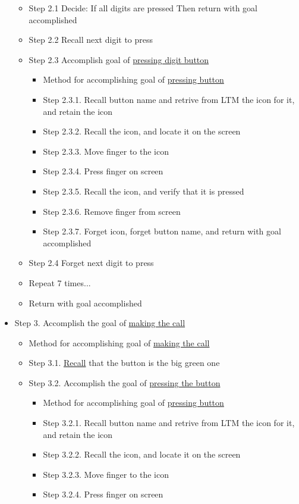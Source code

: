 \documentclass{article}
\begin{document}
\begin{itemize}
\begin{itemize}
    			\item Step 2.1 Decide: If all digits are pressed Then return with goal accomplished
    			\item Step 2.2 Recall next digit to press
    			\item Step 2.3 Accomplish goal of \uline{pressing digit button}
    			\begin{itemize}
					\item Method for accomplishing goal of \uline{pressing button}
					\item Step 2.3.1. Recall button name and retrive from LTM the icon for it, and retain the icon
					\item Step 2.3.2. Recall the icon, and locate it on the screen
					\item Step 2.3.3. Move finger to the icon
					\item Step 2.3.4. Press finger on screen
					\item Step 2.3.5. Recall the icon, and verify that it is pressed
					\item Step 2.3.6. Remove finger from screen
					\item Step 2.3.7. Forget icon, forget button name, and return with goal accomplished
				\end{itemize}
    			\item Step 2.4 Forget next digit to press
    			\item Repeat 7 times...
    			\item Return with goal accomplished
		\end{itemize}
	\item Step 3. Accomplish the goal of \uline{making the call}
		\begin{itemize}
			\item Method for accomplishing goal of \uline{making the call}
			\item Step 3.1. \uline{Recall} that the button is the big green one
			\item Step 3.2. Accomplish the goal of \uline{pressing the button}
				\begin{itemize}
					\item Method for accomplishing goal of \uline{pressing button}
					\item Step 3.2.1. Recall button name and retrive from LTM the icon for it, and retain the icon
					\item Step 3.2.2. Recall the icon, and locate it on the screen
					\item Step 3.2.3. Move finger to the icon
					\item Step 3.2.4. Press finger on screen

\end{itemize}
\end{itemize}
\end{itemize}
\end{document}
